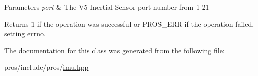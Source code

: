 \begin{DoxyParams}{Parameters}
{\em port} & The V5 Inertial Sensor port number from 1-\/21 \\
\hline
\end{DoxyParams}
\begin{DoxyReturn}{Returns}
1 if the operation was successful or P\+R\+O\+S\+\_\+\+E\+RR if the operation failed, setting errno. 
\end{DoxyReturn}


The documentation for this class was generated from the following file\+:\begin{DoxyCompactItemize}
\item 
pros/include/pros/\hyperlink{imu_8hpp}{imu.\+hpp}\end{DoxyCompactItemize}
